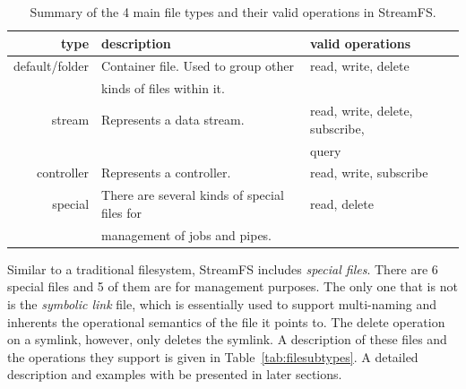 \begin{table}[h]
\begin{center}
\begin{tabular}{| r | l | l |}
	\hline
	\textbf{type} & \textbf{description} & \textbf{valid operations} \\ \hline
	default/folder & Container file.  Used to group other  & read, write, delete  \\
				   & kinds of files within it.  &  \\ \hline

	stream & Represents a data stream. & read, write, delete, subscribe, \\
			&							&query \\ \hline

	controller & Represents a controller. & read, write, subscribe \\ \hline

	special & There are several kinds of special files for  & read, delete \\
		    & management of jobs and pipes. &  \\ 
	\hline
\end{tabular}
\caption{Summary of the 4 main file types and their valid operations in StreamFS.}
\label{tab:filetypes}
\end{center}
\end{table}

Similar to a traditional filesystem, StreamFS includes \emph{special files}.  There are 6 special files and 5 of them 
are for management purposes.  The only one that is not is the \emph{symbolic link} file, which is essentially used to support
multi-naming and inherents the operational semantics of the file it points to.  The delete operation on a symlink, however,
only deletes the symlink.  A description of these files and the operations they support is given in Table~\ref{tab:filesubtypes}.
A detailed description and examples with be presented in later sections.



